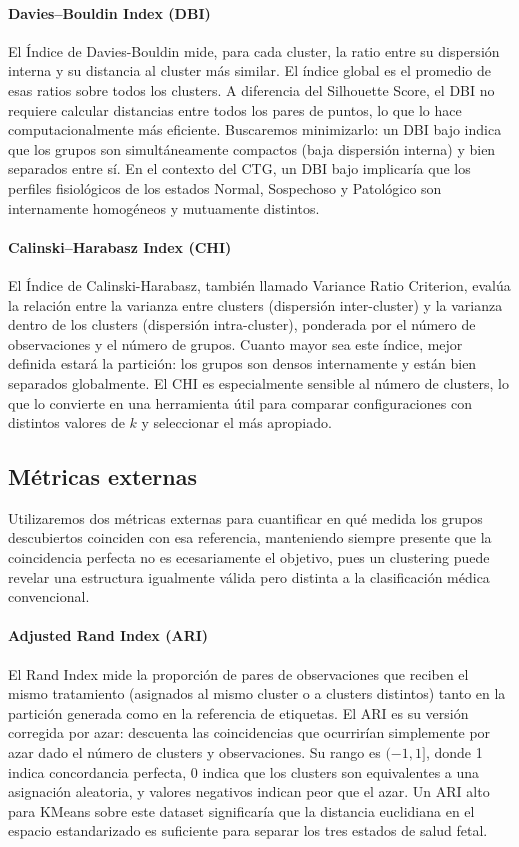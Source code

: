 \documentclass[12pt,letterpaper]{article}
\begin{document}
\paragraph{Davies--Bouldin Index (DBI)}
El Índice de Davies-Bouldin mide, para cada cluster, la ratio entre su dispersión interna y su
distancia al cluster más similar. El índice global es el promedio de esas ratios sobre todos los
clusters. A diferencia del Silhouette Score, el DBI no requiere calcular distancias entre todos
los pares de puntos, lo que lo hace computacionalmente más eficiente. Buscaremos minimizarlo: un
DBI bajo indica que los grupos son simultáneamente compactos (baja dispersión interna) y bien
separados entre sí. En el contexto del CTG, un DBI bajo implicaría que los perfiles fisiológicos
de los estados Normal, Sospechoso y Patológico son internamente homogéneos y mutuamente distintos.

\paragraph{Calinski--Harabasz Index (CHI)}
El Índice de Calinski-Harabasz, también llamado Variance Ratio Criterion, evalúa la relación entre
la varianza entre clusters (dispersión inter-cluster) y la varianza dentro de los clusters
(dispersión intra-cluster), ponderada por el número de observaciones y el número de grupos. Cuanto
mayor sea este índice, mejor definida estará la partición: los grupos son densos internamente y
están bien separados globalmente. El CHI es especialmente sensible al número de clusters, lo que
lo convierte en una herramienta útil para comparar configuraciones con distintos valores de $k$ y
seleccionar el más apropiado.

\subsection{Métricas externas}

Utilizaremos dos métricas externas para cuantificar en qué medida los grupos descubiertos coinciden con esa referencia, manteniendo siempre presente que la coincidencia perfecta no es  ecesariamente el objetivo, pues un clustering puede revelar una estructura igualmente válida pero distinta a la clasificación médica convencional.

\paragraph{Adjusted Rand Index (ARI)}
El Rand Index mide la proporción de pares de observaciones que reciben el mismo tratamiento
(asignados al mismo cluster o a clusters distintos) tanto en la partición generada como en la
referencia de etiquetas. El ARI es su versión corregida por azar: descuenta las coincidencias que
ocurrirían simplemente por azar dado el número de clusters y observaciones. Su rango es $(-1, 1]$,
donde 1 indica concordancia perfecta, 0 indica que los clusters son equivalentes a una asignación
aleatoria, y valores negativos indican peor que el azar. Un ARI alto para K\-Means sobre este
dataset significaría que la distancia euclidiana en el espacio estandarizado es suficiente para
separar los tres estados de salud fetal.
\end{document}
